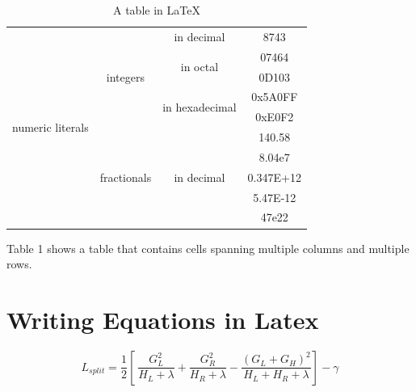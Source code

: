 \documentclass[11pt]{article}
\begin{document}
  \begin{table}[h]
      \centering
      \begin{tabular}{|c|c|c|c|}
           \hline

           \multirow{10}{*}{numeric literals} & \multirow{5}{*}{integers} & in decimal & 8743 \\
           \cline{3-4}
           & & \multirow{2}{*}{in octal} &  07464 \\ 
           \cline{4-4}

           & & & 0D103 \\ 
           \cline {3-4}

           & & \multirow{2}{*}{in hexadecimal} & 0x5A0FF  \\
           \cline{4-4}

           & &  & 0xE0F2 \\
           \cline{2-4}

           & \multirow{5}{*}{fractionals} & \multirow{5}{*}{in decimal} & 140.58 \\
           \cline{4-4}

           & & & 8.04e7 \\
           \cline{4-4}

           & & & 0.347E+12 \\
           \cline{4-4}

           & & & 5.47E-12 \\
           \cline{4-4}

           & & & 47e22 \\
           \hline
      
      
      
      
      
      
      \end{tabular}
      \caption{A table in \LaTeX}
      \label{tab:my_label}
  \end{table}

  \parindent 10mm {Table 1 shows a table that contains cells spanning multiple columns and multiple rows. \cite{random}}


\section{Writing Equations in Latex}

\begin{equation}
    L_{split} = \frac{1}{2} [\ \frac{G_{L}^2}{H_{L} + \lambda} + \frac{G_{R}^2}{H_{R} + \lambda} - \frac{(G_{L}+G_{H})^2}{H_{L} + H_{R} + \lambda} ] - \gamma
\end{equation}
\end{document}
